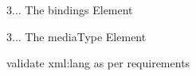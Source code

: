 
\begin{DoxyRefList}
\item[\label{todo__todo000001}%
\hypertarget{todo__todo000001}{}%
\-File \hyperlink{EPUBPackage_8php}{\-E\-P\-U\-B\-Package.php} ]3... \-The bindings \-Element 

3... \-The media\-Type \-Element  
\item[\label{todo__todo000003}%
\hypertarget{todo__todo000003}{}%
\-Member \hyperlink{classFunnyMonkey_1_1EPUB_1_1EPUBPackage_af72609f38b84949f79e57e00ce9808df}{\-Funny\-Monkey} (\$attribute, \$value)]validate xml\-:lang as per requirements 
\end{DoxyRefList}